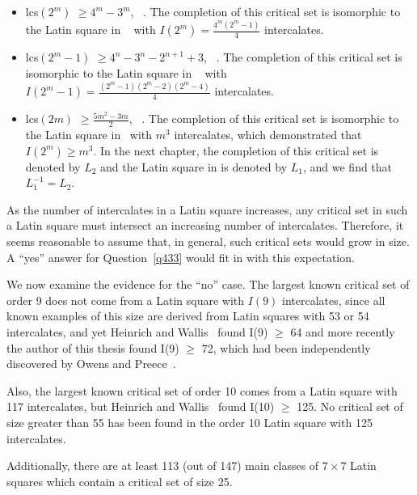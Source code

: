 \documentclass[12pt]{report}
\def\lcs#1{{\rm lcs}$(#1)$}
\begin{document}
\begin{itemize}
\item \lcs{2^m} $\geq 4^m - 3^m$,  ~\cite{MR84g:05036}.  The completion of
this critical set is isomorphic to the Latin square in 
~\cite{MR84g:05034} with $I(2^m) = \displaystyle\frac{4^m(2^m-1)}{4}$ intercalates.
\item \lcs{2^m-1} $\geq 4^n - 3^n - 2^{n+1} + 3$, ~\cite{MR96h:05030}.  The
completion of this critical set is isomorphic to the Latin square in 
~\cite{MR84g:05034} with $I(2^m-1) = \displaystyle\frac{(2^m-1)(2^m-2)(2^m-4)}{4}$ intercalates.
\item \lcs{2m} $\geq \displaystyle\frac{5m^2-3m}{2}$, ~\cite{MR99a:05018}.
The completion of this critical set is isomorphic to the Latin square
in~\cite{MR84g:05034} with $m^3$ intercalates, which demonstrated that 
$I(2^m) \geq m^3$.  In the next chapter, the completion of this critical set 
is denoted by $L_2$ and the Latin square in \cite{MR84g:05034} is denoted by 
$L_1$, and we find that $L_1^{-1} = L_2$.

\end{itemize}


As the number of intercalates in a Latin square increases, any
critical set in such a Latin square must intersect an increasing number
of intercalates.  Therefore, it seems reasonable to assume that, in general,
such critical sets would grow in size.  A ``yes'' answer for Question~\ref{q433} would fit in
with this expectation.


We now examine the evidence for the ``no'' case.  The largest known
critical set of order 9 does not come from a Latin square with $I(9)$
intercalates, since all known examples of this size are derived
from Latin squares with 53 or 54 intercalates, and yet Heinrich and
Wallis~\cite{MR84g:05034} found I(9) $\geq$ 64 and more recently the author
of this thesis
found I(9) $\geq$ 72, which had been independently discovered by Owens
and Preece~\cite{MR96g:05029}.

Also, the largest known critical set of order 10 comes from a Latin
square with 117 intercalates, but Heinrich and Wallis~\cite{MR84g:05034}
found I(10) $\geq$ 125.  No critical set of size greater than 55 has
been found in the order 10 Latin square with 125 intercalates.

Additionally, there are at least 113 (out of 147) main classes of
$7 \times 7$ Latin squares which contain a critical set of size 25.
\end{document}
